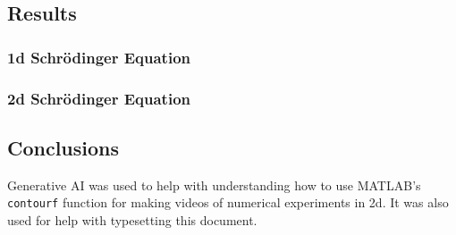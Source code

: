 \documentclass[10pt]{article}
\def\code#1{\texttt{#1}} %
\begin{document}

\subsection*{Results}

\subsubsection*{1d Schrödinger Equation}



\subsubsection*{2d Schrödinger Equation}




\subsection*{Conclusions}



Generative AI was used to help with understanding how to use MATLAB's \code{contourf} function for 
making videos of numerical experiments in 2d. It was also used for help with typesetting this document.

\pagebreak

\end{document}
